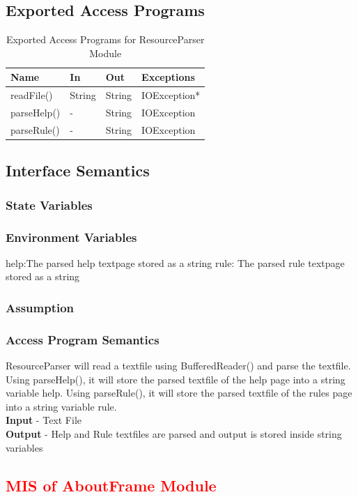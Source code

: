 \documentclass[11pt]{article}
\begin{document}
    \subsection{Exported Access Programs}
    \begin{table}[H]
    \caption{Exported Access Programs for ResourceParser Module}
    \begin{tabular}{p{4cm}p{2cm}p{2cm}p{4cm}}
    Name & In & Out & Exceptions\\
    \hline
	readFile() & String & String & IOException*\\
	\hline
    parseHelp() & - & String & IOException\\
    \hline
    parseRule() & - & String & IOException\\
    \hline
    \end{tabular}
    \end{table}
    
    \subsection{Interface Semantics}
    \subsubsection{State Variables}
    
    \subsubsection{Environment Variables}
	help:The parsed help textpage stored as a string 
	\newline
	rule: The parsed rule textpage stored as a string
    \subsubsection{Assumption}
    
    \subsubsection{Access Program Semantics}
    ResourceParser will read a textfile using BufferedReader() and parse the textfile. Using parseHelp(), it will store the parsed textfile of the help page into a string variable help. Using parseRule(), it will store the parsed textfile of the rules page into a string variable rule.  \\
    \textbf{Input} - Text File\\
    \textbf{Output} - Help and Rule textfiles are parsed and output is stored inside string variables  
    \newline
    \textcolor{red}{
    \section{MIS of AboutFrame Module}
    }
\end{document}

